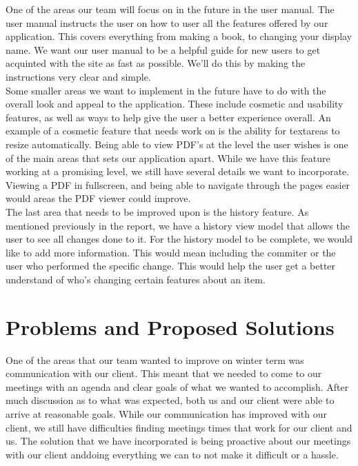 \documentclass[onecolumn, draftclsnofoot,10pt, compsoc]{IEEEtran}
\begin{document}
\noindent One of the areas our team will focus on in the future in the user manual. The user manual instructs 
the user on how to user all the features offered by our application. This covers everything from making 
a book, to changing your display name. We want our user manual to be a helpful guide for new users to get
acquinted with the site as fast as possible. We'll do this by making the instructions very clear and simple. \\

\noindent Some smaller areas we want to implement in the future have to do with the overall look and appeal
to the application. These include cosmetic and usability features, as well as ways to help give the user
a better experience overall. An example of a cosmetic feature that needs work on is the ability for textareas 
to resize automatically. Being able to view PDF's at the level the user wishes is one of the main areas that
sets our application apart. While we have this feature working at a promising level, we still have several 
details we want to incorporate. Viewing a PDF in fullscreen, and being able to navigate through the pages 
easier would areas the PDF viewer could improve. \\

\noindent The last area that needs to be improved upon is the history feature. As mentioned previously in the
report, we have a history view model that allows the user to see all changes done to it. For the history model 
to be complete, we would like to add more information. This would mean including the commiter or the user who 
performed the specific change. This would help the user get a better understand of who's changing certain 
features about an item. \\

\newpage

\section{Problems and Proposed Solutions} 

\noindent One of the areas that our team wanted to improve on winter term was communication with our client.
This meant that we needed to come to our meetings with an agenda and clear goals of what we wanted to 
accomplish. After much discussion as to what was expected, both us and our client were able to arrive at 
reasonable goals. While our communication has improved with our client, we still have difficulties finding 
meetings times that work for our client and us. The solution that we have incorporated is being proactive
about our meetings with our client anddoing everything we can to not make it difficult or a hassle.\\
\end{document}
